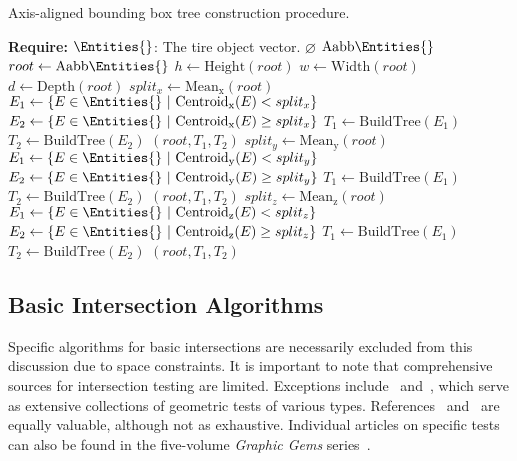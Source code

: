 \begin{breakablealgorithm}
  \caption{Axis-aligned bounding box tree construction procedure.}
  \label{app1:acme_aabbtree_construction}
  \begin{algorithmic}
    \State \textbf{Require:} $\Entities{}$: The tire \Entities{} object vector.
        \State \Return $\varnothing$
      \EndIf
        \State \Return $\mathrm{Aabb}{\Entities{}}$
      \EndIf
      \State $root \gets \mathrm{Aabb}{\Entities{}}$
      \State $h \gets \mathrm{Height}(root)$
      \State $w \gets \mathrm{Width}(root)$
      \State $d \gets \mathrm{Depth}(root)$
        \State $split_{x} \gets \mathrm{Mean_{x}}(root)$
        \State $E_1 \gets \left\{E \in \Entities{} ~|~ \mathrm{Centroid_{x}}(E) < split_{x} \right\}$
        \State $E_2 \gets \left\{E \in \Entities{} ~|~ \mathrm{Centroid_{x}}(E) \ge split_{x} \right\}$
        \State $T_1 \gets \mathrm{BuildTree}(E_1)$
        \State $T_2 \gets \mathrm{BuildTree}(E_2)$
        \State \Return $(root, T_1, T_2)$
        \State $split_{y} \gets \mathrm{Mean_{y}}(root)$
        \State $E_1 \gets \left\{E \in \Entities{} ~|~ \mathrm{Centroid_{y}}(E) < split_{y} \right\}$
        \State $E_2 \gets \left\{E \in \Entities{} ~|~ \mathrm{Centroid_{y}}(E) \ge split_{y} \right\}$
        \State $T_1 \gets \mathrm{BuildTree}(E_1)$
        \State $T_2 \gets \mathrm{BuildTree}(E_2)$
        \State \Return $(root, T_1, T_2)$
      \Else
        \State $split_{z} \gets \mathrm{Mean_{z}}(root)$
        \State $E_1 \gets \left\{E \in \Entities{} ~|~ \mathrm{Centroid_{z}}(E) < split_{z} \right\}$
        \State $E_2 \gets \left\{E \in \Entities{} ~|~ \mathrm{Centroid_{z}}(E) \ge split_{z} \right\}$
        \State $T_1 \gets \mathrm{BuildTree}(E_1)$
        \State $T_2 \gets \mathrm{BuildTree}(E_2)$
        \State \Return $(root, T_1, T_2)$
      \EndIf
    \EndFunction
  \end{algorithmic}
\end{breakablealgorithm}

\subsection{Basic Intersection Algorithms}

Specific algorithms for basic intersections are necessarily excluded from this discussion due to space constraints. It is important to note that comprehensive sources for intersection testing are limited. Exceptions include~\cite{schneider2002geometric} and~\cite{eberly2020robust}, which serve as extensive collections of geometric tests of various types. References~\cite{ericson2004realtime} and~\cite{vandenbergen2003collision} are equally valuable, although not as exhaustive. Individual articles on specific tests can also be found in the five-volume \emph{Graphic Gems} series~\cite{glassner1990graphics, arvo1991graphics, kirk1992graphics, heckbert1994graphics, paeth1995graphics}.

